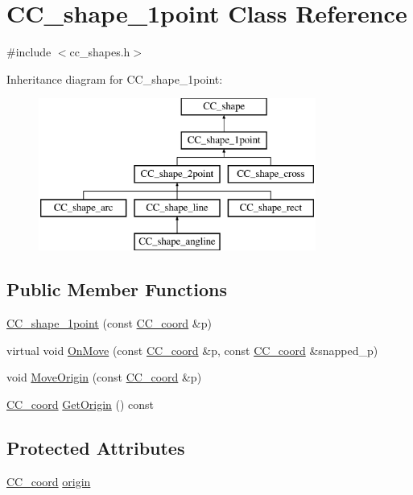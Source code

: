 \hypertarget{a00038}{\section{C\-C\-\_\-shape\-\_\-1point Class Reference}
\label{a00038}
}


{\ttfamily \#include $<$cc\-\_\-shapes.\-h$>$}

Inheritance diagram for C\-C\-\_\-shape\-\_\-1point\-:\begin{figure}[H]
\begin{center}
\leavevmode
\includegraphics[height=5.000000cm]{a00038}
\end{center}
\end{figure}
\subsection*{Public Member Functions}
\begin{DoxyCompactItemize}
\item 
\hyperlink{a00038_a16f6e2d08cb21589759966bdc8827422}{C\-C\-\_\-shape\-\_\-1point} (const \hyperlink{a00029}{C\-C\-\_\-coord} \&p)
\item 
virtual void \hyperlink{a00038_a7110a3e16f7375074baa18efb997060a}{On\-Move} (const \hyperlink{a00029}{C\-C\-\_\-coord} \&p, const \hyperlink{a00029}{C\-C\-\_\-coord} \&snapped\-\_\-p)
\item 
void \hyperlink{a00038_a28d1b929bc908adb4530eb5a75b1bf56}{Move\-Origin} (const \hyperlink{a00029}{C\-C\-\_\-coord} \&p)
\item 
\hyperlink{a00029}{C\-C\-\_\-coord} \hyperlink{a00038_aa053b54300b73b01147d18a667fe8937}{Get\-Origin} () const 
\end{DoxyCompactItemize}
\subsection*{Protected Attributes}
\begin{DoxyCompactItemize}
\item 
\hyperlink{a00029}{C\-C\-\_\-coord} \hyperlink{a00038_a3e7c4e0c903b4331b98351cf8402b0cd}{origin}
\end{DoxyCompactItemize}


